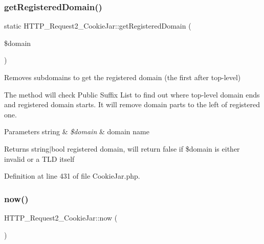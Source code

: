 \hypertarget{classHTTP__Request2__CookieJar_a66c53f8393c3562e58491105165e77a9}{}\label{classHTTP__Request2__CookieJar_a66c53f8393c3562e58491105165e77a9} 
\subsubsection{\texorpdfstring{get\+Registered\+Domain()}{getRegisteredDomain()}}
{\footnotesize\ttfamily static H\+T\+T\+P\+\_\+\+Request2\+\_\+\+Cookie\+Jar\+::get\+Registered\+Domain (\begin{DoxyParamCaption}\item[{}]{\$domain }\end{DoxyParamCaption})\hspace{0.3cm}{\ttfamily [static]}}

Removes subdomains to get the registered domain (the first after top-\/level)

The method will check Public Suffix List to find out where top-\/level domain ends and registered domain starts. It will remove domain parts to the left of registered one.


\begin{DoxyParams}[1]{Parameters}
string & {\em \$domain} & domain name\\
\hline
\end{DoxyParams}
\begin{DoxyReturn}{Returns}
string$\vert$bool registered domain, will return false if \$domain is either invalid or a T\+LD itself 
\end{DoxyReturn}


Definition at line 431 of file Cookie\+Jar.\+php.

\hypertarget{classHTTP__Request2__CookieJar_af7f3ec95c4a5b2594004b455c82081d6}{}\label{classHTTP__Request2__CookieJar_af7f3ec95c4a5b2594004b455c82081d6} 
\subsubsection{\texorpdfstring{now()}{now()}}
{\footnotesize\ttfamily H\+T\+T\+P\+\_\+\+Request2\+\_\+\+Cookie\+Jar\+::now (\begin{DoxyParamCaption}{ }\end{DoxyParamCaption})\hspace{0.3cm}{\ttfamily [protected]}}

